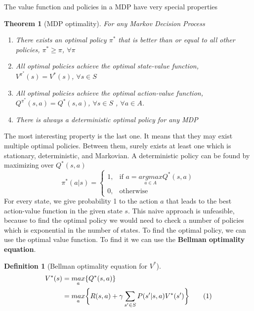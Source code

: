 \documentclass[main.tex]{subfiles}
\newcommand\numberthis{\addtocounter{equation}{1}\tag{\theequation}}
\newtheorem{theorem}{Theorem}[section]
\newtheorem{definition}{Definition}[section]
\begin{document}
The value function and policies in a MDP have very special properties
\begin{theorem}[MDP optimality]
For any Markov Decision Process
\begin{enumerate}
    \item There exists an optimal policy $\pi^*$ that is better than or equal to all other policies, $\pi^* \geq \pi$, $\forall \pi$
    \item All optimal policies achieve the optimal state-value function, $V^{\pi^*}(s) = V^*(s)$, $\forall s \in S$
    \item All optimal policies achieve the optimal action-value function, $Q^{\pi^*}(s,a) = Q^*(s,a)$, $\forall s \in S$ , $\forall a \in A$.
    \item There is always a deterministic optimal policy for any MDP
\end{enumerate}
\end{theorem}
The most interesting property is the last one. It means that they may exist multiple optimal policies. Between them, surely exists at least one which is stationary, deterministic, and Markovian. A deterministic policy can be found by maximizing over $Q^*(s,a)$
\begin{equation}
    \pi^*(a|s) = 
    \begin{cases}
        1,& \text{if } a = \underset{a \in A}{argmax} Q^*(s,a)\\
        0,& \text{otherwise}
    \end{cases}
\end{equation}
For every state, we give probability 1 to the action $a$ that leads to the best action-value function in the given state $s$. This naive approach is unfeasible, because to find the optimal policy we would need to check a number of policies which is exponential in the number of states.
To find the optimal policy, we can use the optimal value function. To find it we can use the \textbf{Bellman optimality equation}.
\begin{definition}[Bellman optimality equation for $V^*$]
\begin{align*}
    V^*(s) &= \underset{a}{max} \{ Q^*(s,a) \} \\
    &= \underset{a}{max} \bigg\{ R(s,a) + \gamma \sum_{s' \in S} P(s'|s,a)V^*(s') \bigg\} \numberthis
\end{align*}
\end{definition}
\end{document}
